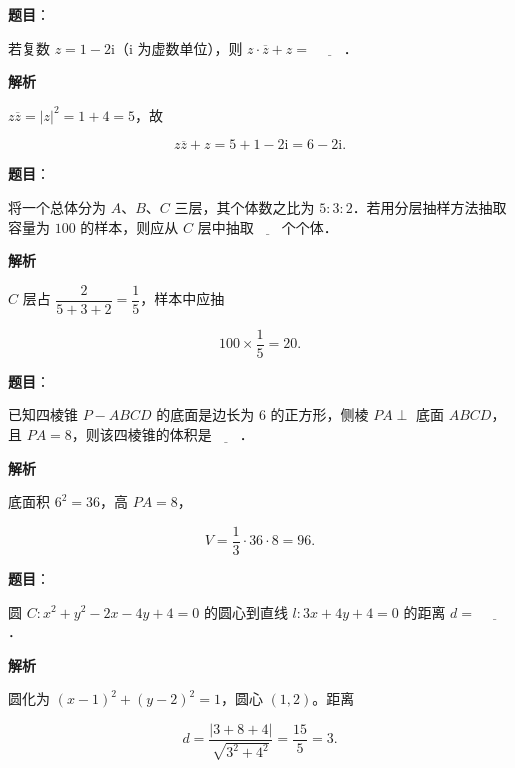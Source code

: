 \begin{answer}

\textbf{题目}：

若复数 $z=1-2\mathrm i$（$\mathrm i$ 为虚数单位），则 $z\cdot\overline z+z=$ $\underline{\qquad}$．

\textbf{解析}

$z\overline z=|z|^2=1+4=5$，故

\nopagebreak[4]
\[z\overline z+z=5+1-2\mathrm i=6-2\mathrm i.\]


\end{answer}
\begin{answer}

\textbf{题目}：

将一个总体分为 $A$、$B$、$C$ 三层，其个体数之比为 $5:3:2$．若用分层抽样方法抽取容量为 $100$ 的样本，则应从 $C$ 层中抽取$\underline{\qquad}$个个体．

\textbf{解析}

$C$ 层占 $\dfrac2{5+3+2}=\dfrac15$，样本中应抽

\nopagebreak[4]
\[100\times\frac15=20.\]


\end{answer}
\begin{answer}

\textbf{题目}：

已知四棱锥 $P-ABCD$ 的底面是边长为 $6$ 的正方形，侧棱 $PA\perp$ 底面 $ABCD$，且 $PA=8$，则该四棱锥的体积是$\underline{\qquad}$．

\textbf{解析}

底面积 $6^2=36$，高 $PA=8$，

\nopagebreak[4]
\[V=\frac13\cdot36\cdot8=96.\]


\end{answer}
\begin{answer}

\textbf{题目}：

圆 $C:x^2+y^2-2x-4y+4=0$ 的圆心到直线 $l:3x+4y+4=0$ 的距离 $d=$ $\underline{\qquad}$．

\textbf{解析}

圆化为 $(x-1)^2+(y-2)^2=1$，圆心 $(1,2)$。距离

\nopagebreak[4]
\[d=\frac{|3+8+4|}{\sqrt{3^2+4^2}}=\frac{15}{5}=3.\]


\end{answer}
